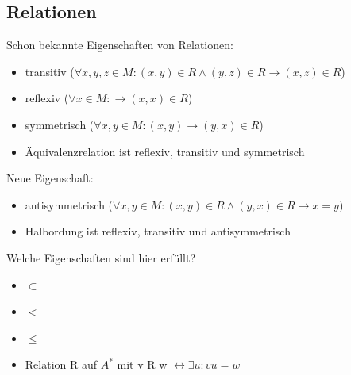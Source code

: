 \documentclass{beamer}
\begin{document}

\begin{frame}
	\titlepage
\end{frame}

\begin{frame}
\section{Relationen}
Schon bekannte Eigenschaften von Relationen: \newline
\begin{itemize}
	\item transitiv ($\forall x, y, z \in M: (x,y) \in R \land (y, z) \in R \rightarrow (x,z) \in R$)
	\item reflexiv ($\forall x \in M: \rightarrow (x,x) \in R$)
	\item symmetrisch ($\forall x, y \in M: (x,y)  \rightarrow (y,x) \in R$)
		\item Äquivalenzrelation ist reflexiv, transitiv und symmetrisch
\end{itemize}
\end{frame}

\begin{frame}

Neue Eigenschaft: \newline
\begin{itemize}
	\item antisymmetrisch ($\forall x, y \in M: (x,y) \in R \land (y, x) \in R \rightarrow x = y$)
	\item Halbordung ist reflexiv, transitiv und antisymmetrisch
\end{itemize}
\end{frame}

\begin{frame}

Welche Eigenschaften sind hier erfüllt? \newline
\begin{itemize}
	\item $\subset$
	\item $<$
	\item $\leq$
	\item Relation R auf $A^*$ mit v R w $\leftrightarrow \exists u: vu=w$
\end{itemize}
\end{frame}
\end{document}

